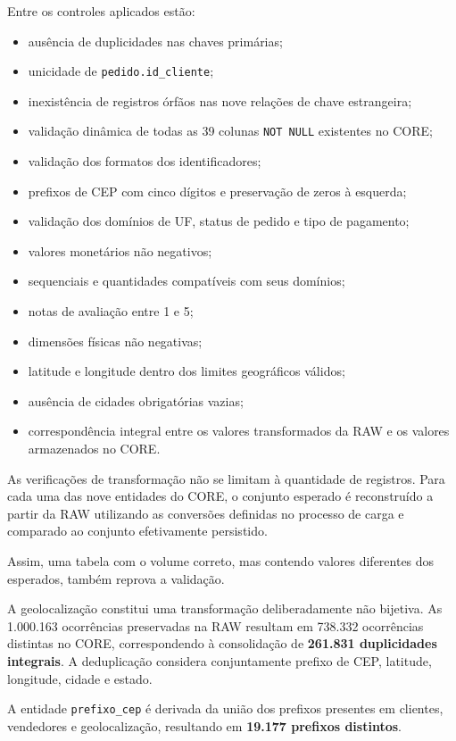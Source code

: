 \documentclass[12pt,a4paper]{article}
\begin{document}
	Entre os controles aplicados estão:
	
	\begin{itemize}[leftmargin=1.2cm]
		\item ausência de duplicidades nas chaves primárias;
		\item unicidade de \texttt{pedido.id\_cliente};
		\item inexistência de registros órfãos nas nove relações de chave estrangeira;
		\item validação dinâmica de todas as 39 colunas \texttt{NOT NULL} existentes
		no CORE;
		\item validação dos formatos dos identificadores;
		\item prefixos de CEP com cinco dígitos e preservação de zeros à esquerda;
		\item validação dos domínios de UF, status de pedido e tipo de pagamento;
		\item valores monetários não negativos;
		\item sequenciais e quantidades compatíveis com seus domínios;
		\item notas de avaliação entre 1 e 5;
		\item dimensões físicas não negativas;
		\item latitude e longitude dentro dos limites geográficos válidos;
		\item ausência de cidades obrigatórias vazias;
		\item correspondência integral entre os valores transformados da RAW e os
		valores armazenados no CORE.
	\end{itemize}
	
	As verificações de transformação não se limitam à quantidade de registros.
	Para cada uma das nove entidades do CORE, o conjunto esperado é reconstruído a
	partir da RAW utilizando as conversões definidas no processo de carga e
	comparado ao conjunto efetivamente persistido.
	
	Assim, uma tabela com o volume correto, mas contendo valores diferentes dos
	esperados, também reprova a validação.
	
	A geolocalização constitui uma transformação deliberadamente não bijetiva.
	As 1.000.163 ocorrências preservadas na RAW resultam em 738.332 ocorrências
	distintas no CORE, correspondendo à consolidação de
	\textbf{261.831 duplicidades integrais}. A deduplicação considera conjuntamente
	prefixo de CEP, latitude, longitude, cidade e estado.
	
	A entidade \texttt{prefixo\_cep} é derivada da união dos prefixos presentes em
	clientes, vendedores e geolocalização, resultando em
	\textbf{19.177 prefixos distintos}.
	
\end{document}
